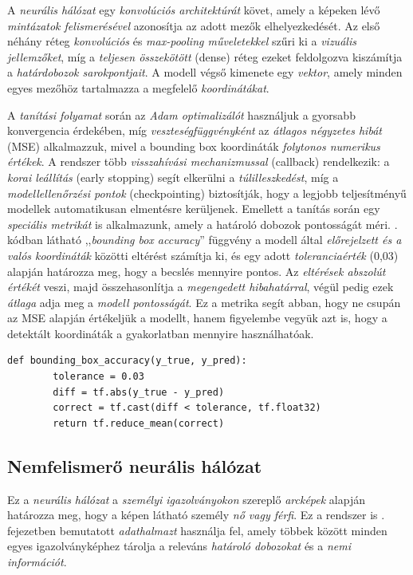 \documentclass[
]{thesis-ekf}
\theoremstyle{definition}
\theoremstyle{remark}
\begin{document}
A \emph{neurális hálózat} egy \emph{konvolúciós architektúrát} követ, amely a képeken lévő \emph{mintázatok felismerésével} azonosítja az adott mezők elhelyezkedését. Az első néhány réteg \emph{konvolúciós} és \emph{max-pooling műveletekkel} szűri ki a \emph{vizuális jellemzőket}, míg a \emph{teljesen összekötött} (dense) réteg ezeket feldolgozva kiszámítja a \emph{határdobozok sarokpontjait}. A modell végső kimenete egy \emph{vektor}, amely minden egyes mezőhöz tartalmazza a megfelelő \emph{koordinátákat}.

A \emph{tanítási folyamat} során az \emph{Adam optimalizálót} használjuk a gyorsabb konvergencia érdekében, míg \emph{veszteségfüggvényként} az \emph{átlagos négyzetes hibát} (MSE) alkalmazzuk, mivel a bounding box koordináták \emph{folytonos numerikus értékek}. A rendszer több \emph{visszahívási mechanizmussal} (callback) rendelkezik: a \emph{korai leállítás} (early stopping) segít elkerülni a \emph{túlilleszkedést}, míg a \emph{modellellenőrzési pontok} (checkpointing) biztosítják, hogy a legjobb teljesítményű modellek automatikusan elmentésre kerüljenek. Emellett a tanítás során egy \emph{speciális metrikát} is alkalmazunk, amely a határoló dobozok pontosságát méri. . kódban látható ,,\emph{bounding box accuracy}'' függvény a modell által \emph{előrejelzett és a valós koordináták} közötti eltérést számítja ki, és egy adott \emph{toleranciaérték} (0,03) alapján határozza meg, hogy a becslés mennyire pontos. Az \emph{eltérések abszolút értékét} veszi, majd összehasonlítja a \emph{megengedett hibahatárral}, végül pedig ezek \emph{átlaga} adja meg a \emph{modell pontosságát}. Ez a metrika segít abban, hogy ne csupán az MSE alapján értékeljük a modellt, hanem figyelembe vegyük azt is, hogy a detektált koordináták a gyakorlatban mennyire használhatóak.

\begin{lstlisting}[style=mypython, caption=Határoló doboz pontosság kiszámítása, label=kod-python6]
	def bounding_box_accuracy(y_true, y_pred):
		tolerance = 0.03
		diff = tf.abs(y_true - y_pred)
		correct = tf.cast(diff < tolerance, tf.float32)
		return tf.reduce_mean(correct)
\end{lstlisting}

\subsection{Nemfelismerő neurális hálózat}

Ez a \emph{neurális hálózat} a \emph{személyi igazolványokon} szereplő \emph{arcképek} alapján határozza meg, hogy a képen látható személy \emph{nő vagy férfi}. Ez a rendszer is . fejezetben bemutatott \emph{adathalmazt} használja fel, amely többek között minden egyes igazolványképhez tárolja a releváns \emph{határoló dobozokat} és a \emph{nemi információt}.
\end{document}

